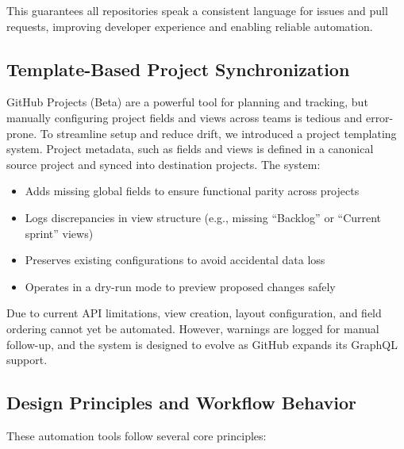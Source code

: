 This guarantees all repositories speak a consistent language for issues and
pull requests, improving developer experience and enabling reliable
automation.

\subsection{Template-Based Project Synchronization}

GitHub Projects (Beta) are a powerful tool for planning and tracking,
but manually configuring project fields and views across teams is
tedious and error-prone. To streamline setup and reduce drift, we
introduced a project templating system. Project metadata, such as fields
and views is defined in a canonical source project and synced into
destination projects. The system:

\begin{itemize}
  \item Adds missing global fields to ensure functional parity across projects

  \item Logs discrepancies in view structure (e.g., missing ``Backlog''
    or ``Current sprint'' views)

  \item Preserves existing configurations to avoid accidental data loss

  \item Operates in a dry-run mode to preview proposed changes safely
\end{itemize}

Due to current API limitations, view creation, layout configuration, and
field ordering cannot yet be automated. However, warnings are logged for
manual follow-up, and the system is designed to evolve as GitHub expands
its GraphQL support.

\subsection{Design Principles and Workflow Behavior}


These automation tools follow several core principles:


